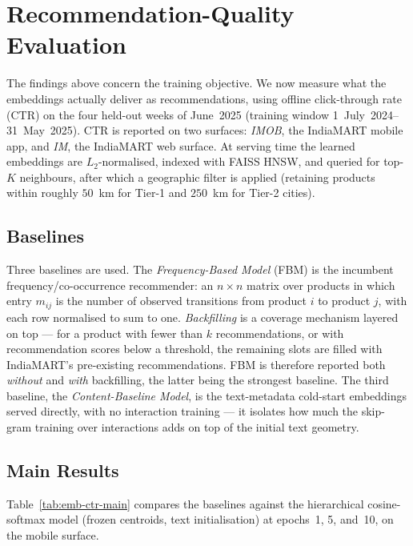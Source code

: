 \section{Recommendation-Quality Evaluation}
\label{sec:emb-ctr}

The findings above concern the training objective. We now measure what the
embeddings actually deliver as recommendations, using offline click-through
rate (CTR) on the four held-out weeks of June~2025 (training window
1~July~2024--31~May~2025). CTR is reported on two surfaces: \emph{IMOB}, the
IndiaMART mobile app, and \emph{IM}, the IndiaMART web surface. At serving time
the learned embeddings are $L_2$-normalised, indexed with FAISS HNSW, and
queried for top-$K$ neighbours, after which a geographic filter is applied
(retaining products within roughly $50$~km for Tier-1 and $250$~km for Tier-2
cities).

\subsection{Baselines}
\label{sec:emb-baselines}
Three baselines are used. The \emph{Frequency-Based Model} (FBM) is the
incumbent frequency/co-occurrence recommender: an $n\times n$ matrix over
products in which entry $m_{ij}$ is the number of observed transitions from
product $i$ to product $j$, with each row normalised to sum to one.
\emph{Backfilling} is a coverage mechanism layered on top --- for a product with
fewer than $k$ recommendations, or with recommendation scores below a
threshold, the remaining slots are filled with IndiaMART's pre-existing
recommendations. FBM is therefore reported both \emph{without} and \emph{with}
backfilling, the latter being the strongest baseline. The third baseline, the
\emph{Content-Baseline Model}, is the text-metadata cold-start embeddings served
directly, with no interaction training --- it isolates how much the skip-gram
training over interactions adds on top of the initial text geometry.

\subsection{Main Results}
\label{sec:emb-main-ctr}
Table~\ref{tab:emb-ctr-main} compares the baselines against the hierarchical
cosine-softmax model (frozen centroids, text initialisation) at epochs~1, 5,
and~10, on the mobile surface.

